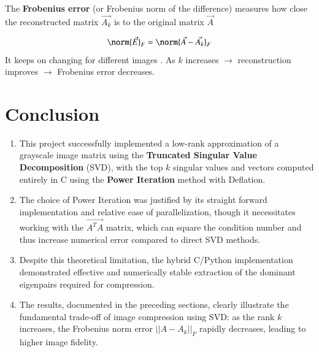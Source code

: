 \documentclass[journal,12pt,onecolumn]{IEEEtran}
\theoremstyle{remark}
\begin{document}
\begin{justify}
The \textbf{Frobenius error} (or Frobenius norm of the difference) measures how close the reconstructed matrix $\vec{A_k}$ is to the original matrix $\vec{A}$ 

\begin{align*}
    \norm{\vec{E}}_F = \norm{\vec{A} - \vec{A_k}}_F
\end{align*}
It keeps on changing for different images . As $k$ increases $\rightarrow$ reconstruction improves $\rightarrow$ Frobenius error decreases.\\
\vspace{0.5em}

\begin{table}[H]
\begin{minipage}[t]{0.32\textwidth}
    \centering
    
    \caption*{einstein.jpg}
\end{minipage} 
\hfill
\begin{minipage}[t]{0.3\textwidth}
    \centering
   
    \caption*{globe.jpg}
\end{minipage}
\hfill
\begin{minipage}[t]{0.3\textwidth}
    \centering
  
   \caption*{greyscale.png}
\end{minipage}

\caption{Frobenius error for different images}

\end{table}

\end{justify}
\section{\textbf{Conclusion}}
\begin{justify}
\begin{enumerate}
    \item 
    This project successfully implemented a low-rank approximation of a grayscale image matrix using the \textbf{Truncated Singular Value Decomposition} (SVD), with the top $k$ singular values and vectors computed entirely in C using the \textbf{Power Iteration} method with  Deflation.

\item The choice of Power Iteration was justified by its straight forward implementation and relative ease of parallelization, though it necessitates working with the $\vec{A^T A}$ matrix, which can square the condition number and thus increase numerical error compared to direct SVD methods.
\item Despite this theoretical limitation, the hybrid C/Python implementation demonstrated effective and numerically stable extraction of the dominant eigenpairs required for compression.

\item The results, documented in the preceding sections, clearly illustrate the fundamental trade-off of image compression using SVD: as the rank $k$ increases, the Frobenius norm error $||A-A_k||_{F}$ rapidly decreases, leading to higher image fidelity. 


\end{enumerate}
\end{justify}
\end{document}
